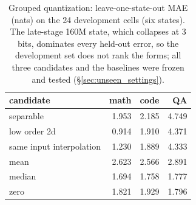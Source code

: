 \begin{table}[H]\centering\footnotesize
\begin{tabular}{@{}lrrr@{}}
\toprule
candidate & math & code & QA \\
\midrule
separable & 1.953 & 2.185 & 4.749 \\
low order 2d & 0.914 & 1.910 & 4.371 \\
same input interpolation & 1.230 & 1.889 & 4.333 \\
mean & 2.623 & 2.566 & 2.891 \\
median & 1.694 & 1.758 & 1.777 \\
zero & 1.821 & 1.929 & 1.796 \\
\bottomrule\end{tabular}
\caption{Grouped quantization: leave-one-state-out MAE (nats) on the 24 development cells (six states). The late-stage 160M state, which collapses at 3 bits, dominates every held-out error, so the development set does not rank the forms; all three candidates and the baselines were frozen and tested (\S\ref{sec:unseen_settings}).}
\label{tab:v55_loso}\end{table}
